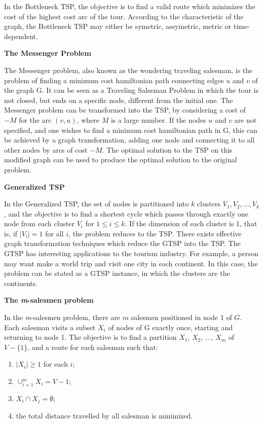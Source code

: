 In the Bottleneck TSP, the objective is to find a valid route which minimizes the cost of the 
highest cost arc of the tour. According to the characteristic of the graph,
the Bottleneck TSP may either be symetric, assymetric, metric or time-dependent.

\textbf{The Messenger Problem}

The Messenger problem, also known as the wondering traveling salesman, is the problem 
of finding a minimum cost hamiltonian path connecting edges $u$ and $v$ of the graph G.
It can be seen as a Traveling Salesman Problem in which the tour is not closed, but ends on a specific node,
different from the initial one. The Messenger problem can be transformed into the TSP,
by considering a cost of $-M$ for the arc $(v, u)$, where $M$ is a large number.
If the nodes $u$ and $v$ are not specified, and one wishes to find a minimum cost hamiltonian path in G,
this can be achieved by a graph transformation, adding one node and connecting it to all other nodes by arcs of cost $-M$.
The optimal solution to the TSP on this modified graph can be used to produce the optimal solution to the original problem.

\textbf{Generalized TSP}

In the Generalized TSP, the set of nodes is partitioned into $k$ clusters  $V_{1}, V_{2}, ..., V_{k}$,
and the objective is to find a shortest cycle which passes through exactly one node from each cluster $V_{i}$ for $ 1 \leq i \leq k$.
If the dimension of each cluster is 1, that is, if $|V_{i}| = 1$ for all $i$, the problem reduces to the TSP.
There exists effective graph transformation techniques which reduce the GTSP into the TSP.
The GTSP has interesting applications to the tourism industry. For example, a person may want make a world trip and visit one city in each continent.
In this case, the problem can be stated as a GTSP instance, in which the clusters are the continents.

\textbf{The \textit{m}-salesmen problem}

In the \textit{m}-salesmen problem, there are $m$ salesmen positioned
in node 1 of $G$. Each salesman visits a subset $X_{i}$ of nodes of G exactly once,
starting and returning to node 1. The objective is to find 
a partition $X_{1}$, $X_{2}$, ..., $X_{m}$ of $V-\{1\}$,
and a route for each salesman such that:
\begin{enumerate}
  \item $|X_{i}| \geq 1$ for each $i$;
  \item $\cup_{i=1}^{m} X_{i}=V-{1}$;
  \item $X_{i} \cap X_{j} = \emptyset$;
  \item the total distance travelled by all salesman is minimized.
\end{enumerate}   




